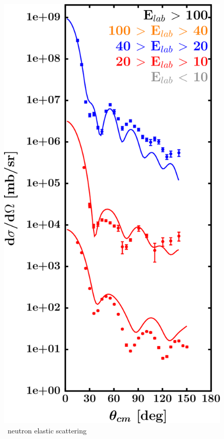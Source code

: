 \begin{figure}[hbtp]
\begin{minipage}{0.47\textwidth}
        \includegraphics[width=\textwidth]{figures/sn124_neutronElastic.png}
        \caption*{\snFour\ neutron elastic scattering}
        \label{DOMFitData_sn124_neutron_elastic}
    \end{minipage}
\end{figure}
\vspace{0.70in}
